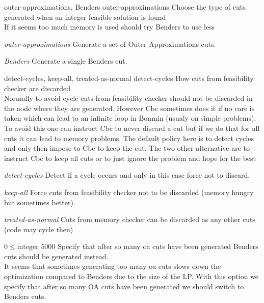 %
{outer-approximations, Benders}%
{outer-approximations}%
{Choose the type of cuts generated when an integer feasible solution is found\\
If it seems too much memory is used should try Benders to use less}%
{\begin{list}{}{
\setlength{\parsep}{0em}
\setlength{\leftmargin}{3ex}
\setlength{\labelwidth}{1ex}
\setlength{\itemindent}{0ex}
\setlength{\topsep}{0pt}}
\item[\textit{outer-approximations}] Generate a set of Outer Approximations cuts.
\item[\textit{Benders}] Generate a single Benders cut.
\end{list}
}

%
{detect-cycles, keep-all, treated-as-normal}%
{detect-cycles}%
{How cuts from feasibility checker are discarded\\
Normally to avoid cycle cuts from feasibility checker should not be discarded in the node where they are generated. However Cbc sometimes does it if no care is taken which can lead to an infinite loop in Bonmin (usualy on simple problems). To avoid this one can instruct Cbc to never discard a cut but if we do that for all cuts it can lead to memory problems. The default policy here is to detect cycles and only then impose to Cbc to keep the cut. The two other alternative are to instruct Cbc to keep all cuts or to just ignore the problem and hope for the best}%
{\begin{list}{}{
\setlength{\parsep}{0em}
\setlength{\leftmargin}{3ex}
\setlength{\labelwidth}{1ex}
\setlength{\itemindent}{0ex}
\setlength{\topsep}{0pt}}
\item[\textit{detect-cycles}] Detect if a cycle occurs and only in this case force not to discard.
\item[\textit{keep-all}] Force cuts from feasibility checker not to be discarded (memory hungry but sometimes better).
\item[\textit{treated-as-normal}] Cuts from memory checker can be discarded as any other cuts (code may cycle then)
\end{list}
}

%
{$0\leq\textrm{integer}$}%
{$5000$}%
{Specify that after so many oa cuts have been generated Benders cuts should be generated instead.\\
It seems that sometimes generating too many oa cuts slows down the optimization compared to Benders due to the size of the LP. With this option we specify that after so many OA cuts have been generated we should switch to Benders cuts.}%
{}

